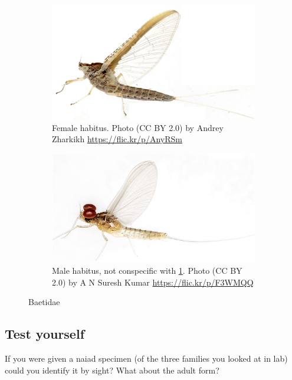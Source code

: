 \documentclass[letterpaper, 11pt]{article}
\begin{document}
\begin{figure}[ht!]
    \centering
    \begin{subfigure}[ht!]{0.45\textwidth}
        \includegraphics[width=\textwidth]{BaetidaeFemHabitus}
        \caption{Female habitus. Photo (CC BY 2.0) by Andrey Zharkikh \url{https://flic.kr/p/AnyRSm}}
        \label{fig:baetid1}
    \end{subfigure}
    \hfill
    \begin{subfigure}[ht!]{0.45\textwidth}
        \includegraphics[width=\textwidth]{BaetidaeMaleHabitus}
        \caption{Male habitus, not conspecific with \ref{fig:baetid1}. Photo (CC BY 2.0) by A N Suresh Kumar \url{https://flic.kr/p/F3WMQQ}}
        \label{fig:baetid2}
    \end{subfigure}
    \caption{Baetidae}\label{fig:baetids}
\end{figure}

\subsection*{Test yourself}
If you were given a naiad specimen (of the three families you looked at in lab) could you identify it by sight? What about the adult form?
\end{document}
